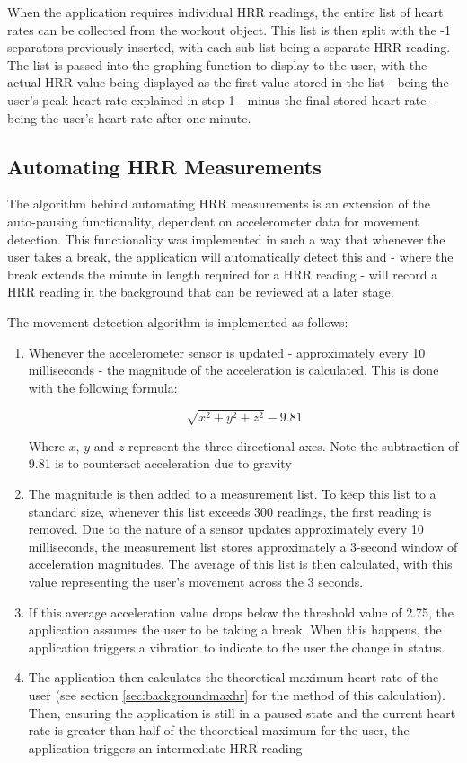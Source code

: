 \documentclass{l4proj}
\begin{document}
When the application requires individual HRR readings, the entire list of heart rates can be collected from the workout object. This list is then split with the -1 separators previously inserted, with each sub-list being a separate HRR reading. The list is passed into the graphing function to display to the user, with the actual HRR value being displayed as the first value stored in the list - being the user’s peak heart rate explained in step 1 - minus the final stored heart rate - being the user’s heart rate after one minute.


\subsection{Automating HRR Measurements}
\label{sec:autohrr}

The algorithm behind automating HRR measurements is an extension of the auto-pausing functionality, dependent on accelerometer data for movement detection. This functionality was implemented in such a way that whenever the user takes a break, the application will automatically detect this and - where the break extends the minute in length required for a HRR reading - will record a HRR reading in the background that can be reviewed at a later stage.

The movement detection algorithm is implemented as follows:

\begin{enumerate}
    \item Whenever the accelerometer sensor is updated - approximately every 10 milliseconds - the magnitude of the acceleration is calculated. This is done with the following formula:

    $$
    \sqrt{x^2 + y^2 + z^2} - 9.81
    $$
    
    Where $x$, $y$ and $z$ represent the three directional axes. Note the subtraction of 9.81 is to counteract acceleration due to gravity
    \item The magnitude is then added to a measurement list. To keep this list to a standard size, whenever this list exceeds 300 readings, the first reading is removed. Due to the nature of a sensor updates approximately every 10 milliseconds, the measurement list stores approximately a 3-second window of acceleration magnitudes. The average of this list is then calculated, with this value representing the user’s movement across the 3 seconds.
    \item If this average acceleration value drops below the threshold value of 2.75, the application assumes the user to be taking a break. When this happens, the application triggers a vibration to indicate to the user the change in status. 
    \item The application then calculates the theoretical maximum heart rate of the user (see section \ref{sec:backgroundmaxhr} for the method of this calculation). Then, ensuring the application is still in a paused state and the current heart rate is greater than half of the theoretical maximum for the user, the application triggers an intermediate HRR reading
\end{enumerate}
\end{document}
